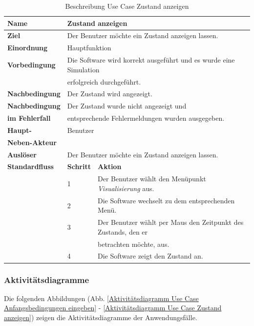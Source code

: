 \begin{table} [H]
	\centering
	\begin{tabular}{|l|l|l|}
		\hline
		\textbf{Name} 			& \multicolumn{2}{|l|}{Zustand anzeigen}  \\
		\hline
		\textbf{Ziel} 			& \multicolumn{2}{|l|}{Der Benutzer möchte ein Zustand anzeigen lassen. }\\ 
		\hline
		\textbf{Einordnung}		& \multicolumn{2}{|l|}{Hauptfunktion}\\
		\hline
		\textbf{Vorbedingung}	& \multicolumn{2}{|l|}{Die Software wird korrekt ausgeführt und es wurde eine Simulation} \\
		& \multicolumn{2}{|l|}{ erfolgreich durchgeführt.} \\
		\hline
		\textbf{Nachbedingung}	& \multicolumn{2}{|l|}{Der Zustand wird angezeigt.}\\
		\hline
		\textbf{Nachbedingung} 	& \multicolumn{2}{|l|}{Der Zustand wurde nicht angezeigt und}\\
		\textbf{im Fehlerfall}	& \multicolumn{2}{|l|}{entsprechende Fehlermeldungen wurden ausgegeben.}\\
		\hline
		\textbf{Haupt-} 		& \multicolumn{2}{|l|}{Benutzer}\\
		\textbf{Neben-Akteur}	& \multicolumn{2}{|l|}{	}			\\
		\hline
		\textbf{Auslöser} 		& \multicolumn{2}{|l|}{Der Benutzer möchte ein Zustand anzeigen lassen.} \\
		\hline 
		\textbf{Standardfluss} & \textbf{Schritt} & \textbf{Aktion} \\
		\hline
		&	1	& Der Benutzer wählt den Menüpunkt \emph{Visualisierung} aus. \\
		\cline{2-3}
		&	2	& Die Software wechselt zu dem entsprechenden Menü.\\
		\cline{2-3}
		&	3	& Der Benutzer wählt per Maus den Zeitpunkt des Zustands, den er\\ 
		&       & betrachten möchte, aus.\\
		\cline{2-3}
		&	4	& Die Software zeigt den Zustand an.\\
		\hline
	\end{tabular}
	\caption{Beschreibung Use Case Zustand anzeigen}
	\label{Beschreibung Use Case Zustand anzeigen}
\end{table}

\subsubsection{Aktivitätsdiagramme}
Die folgenden Abbildungen (Abb. \ref{Aktivitätsdiagramm Use Case Anfangsbedingungen eingeben} - \ref{Aktivitätsdiagramm Use Case Zustand anzeigen}) zeigen die Aktivitätsdiagramme der Anwendungsfälle.


